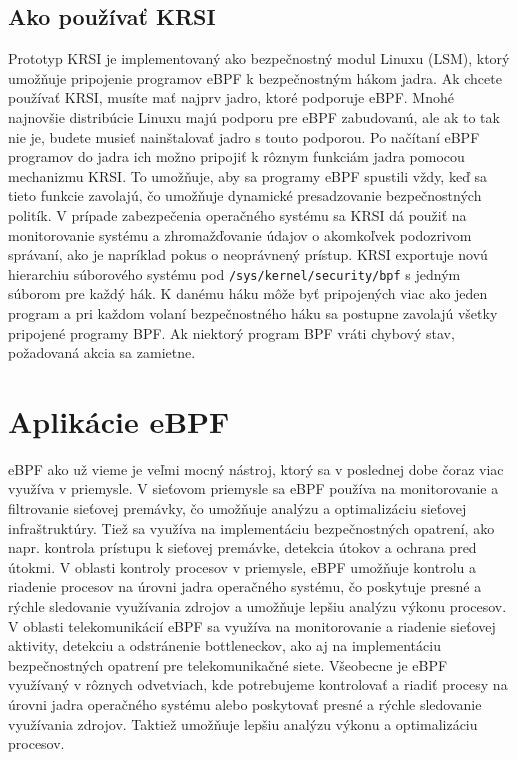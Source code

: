 \subsection*{Ako používať KRSI}
Prototyp KRSI je implementovaný ako bezpečnostný modul Linuxu (LSM), ktorý umožňuje pripojenie programov eBPF k bezpečnostným hákom jadra. 
Ak chcete používať KRSI, musíte mať najprv jadro, ktoré podporuje eBPF. Mnohé najnovšie distribúcie Linuxu majú podporu pre eBPF zabudovanú, 
ale ak to tak nie je, budete musieť nainštalovať jadro s touto podporou. Po načítaní eBPF programov do jadra ich možno pripojiť k rôznym 
funkciám jadra pomocou mechanizmu KRSI. To umožňuje, aby sa programy eBPF spustili vždy, keď sa tieto funkcie zavolajú, čo umožňuje dynamické 
presadzovanie bezpečnostných politík. V prípade zabezpečenia operačného systému sa KRSI dá použiť na monitorovanie systému a zhromažďovanie údajov 
o akomkoľvek podozrivom správaní, ako je napríklad pokus o neoprávnený prístup. KRSI exportuje novú hierarchiu súborového systému 
pod \texttt{/sys/kernel/security/bpf} s jedným súborom pre každý hák. K danému háku môže byť pripojených viac ako jeden program a pri 
každom volaní bezpečnostného háku sa postupne zavolajú všetky pripojené programy BPF. Ak niektorý program BPF vráti chybový stav, 
požadovaná akcia sa zamietne.

\section{Aplikácie eBPF}
eBPF ako už vieme je veľmi mocný nástroj, ktorý sa v poslednej dobe čoraz viac využíva v priemysle. V sieťovom priemysle sa eBPF používa na monitorovanie 
a filtrovanie sieťovej premávky, čo umožňuje analýzu a optimalizáciu sieťovej infraštruktúry. Tiež sa využíva na implementáciu bezpečnostných opatrení, 
ako napr. kontrola prístupu k sieťovej premávke, detekcia útokov a ochrana pred útokmi. V oblasti kontroly procesov v priemysle, eBPF umožňuje kontrolu 
a riadenie procesov na úrovni jadra operačného systému, čo poskytuje presné a rýchle sledovanie využívania zdrojov a umožňuje lepšiu analýzu výkonu procesov. 
V oblasti telekomunikácií eBPF sa využíva na monitorovanie a riadenie sieťovej aktivity, detekciu a odstránenie bottleneckov, ako aj na implementáciu 
bezpečnostných opatrení pre telekomunikačné siete. Všeobecne je eBPF využívaný v rôznych odvetviach, kde potrebujeme kontrolovať a riadiť procesy 
na úrovni jadra operačného systému alebo poskytovať presné a rýchle sledovanie využívania zdrojov. Taktiež umožňuje lepšiu analýzu výkonu 
a optimalizáciu procesov.

